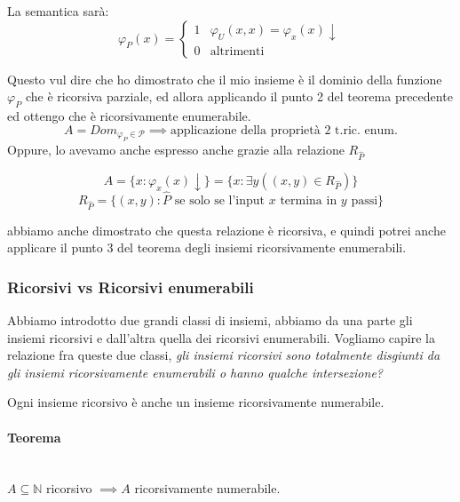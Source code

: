 \documentclass{article}
\begin{document}
La semantica sarà:
\[
    \varphi_P(x)=
    \begin{cases}
        1 & \varphi_U(x,x)=\varphi_x(x)\downarrow \\
        0 & \text{altrimenti}
    \end{cases}
\]

Questo vul dire che ho dimostrato che il mio insieme è il dominio della
funzione $\varphi_P$ che è ricorsiva parziale, ed allora applicando
il punto 2 del teorema precedente ed ottengo che è ricorsivamente
enumerabile.
$$A=Dom_{\varphi_P\in\mathcal{P}}\implies\text{applicazione della proprietà 2 t.ric. enum.}$$
Oppure, lo avevamo anche espresso anche grazie alla relazione $R_{\hat{P}}$

$$A=\{x:\varphi_x(x)\downarrow\}=\{x:\exists y((x,y)\in R_{\hat{P}})\}$$
$$R_{\hat{P}}=\{(x,y):\hat{P}\text{ se solo se l'input }x\text{ termina in }y \text{ passi}\}$$

abbiamo anche dimostrato che questa relazione è ricorsiva, e quindi potrei anche applicare il punto
3 del teorema degli insiemi ricorsivamente enumerabili.

\subsubsection{Ricorsivi vs Ricorsivi enumerabili}
Abbiamo introdotto due grandi classi di insiemi, abbiamo da una parte gli insiemi ricorsivi e dall'altra
quella dei ricorsivi enumerabili. Vogliamo capire la relazione fra queste due classi, \textit{gli
    insiemi ricorsivi sono totalmente disgiunti da gli insiemi ricorsivamente enumerabili o hanno
    qualche intersezione?}

Ogni insieme ricorsivo è anche un insieme ricorsivamente numerabile.
\paragraph{Teorema}\mbox{}\\
$A\subseteq\mathbb{N}$ ricorsivo $\implies A$ ricorsivamente numerabile.
\end{document}
